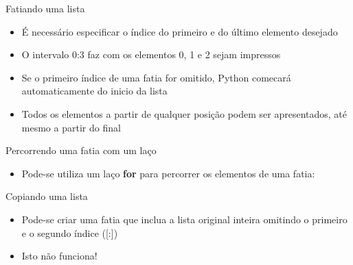 \begin{frame}{Fatiando uma lista}
  \begin{itemize}
    \item É necessário especificar o índice do primeiro e do último elemento desejado
    
    \item O intervalo 0:3 faz com os elementos 0, 1 e 2 sejam impressos
    \item Se o primeiro índice de uma fatia for omitido, Python comecará automaticamente do inicio da lista
    
    \item Todos os elementos a partir de qualquer posição podem ser apresentados, até mesmo a partir do final
    
  \end{itemize}
\end{frame}
%
\begin{frame}[t, fragile]{Percorrendo uma fatia com um laço}
  \begin{itemize}
    \item Pode-se utiliza um laço {\bf for} para percorrer os elementos de uma fatia:                                                                                                                                                  
    
  \end{itemize}
\end{frame}
%
\begin{frame}[t, fragile]{Copiando uma lista}
  \begin{itemize}
    \item Pode-se criar uma fatia que inclua a lista original inteira omitindo o primeiro e o segundo índice ([:])
    
    \item \alert{Isto não funciona!}
    
  \end{itemize}  
\end{frame}
%





 